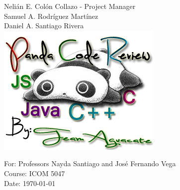 \begin{titlepage}
\begin{center}
Nelián E. Colón Collazo - Project Manager \\
Samuel A. Rodríguez Martínez \\
Daniel A. Santiago Rivera \\[1cm]

\includegraphics[scale=1.25]{img/pandaLogoAguacate}\\[1cm]

\vfill

For: Professors Nayda Santiago and José Fernando Vega \\
Course: ICOM 5047 \\
Date: \today






\end{center}

\end{titlepage}
